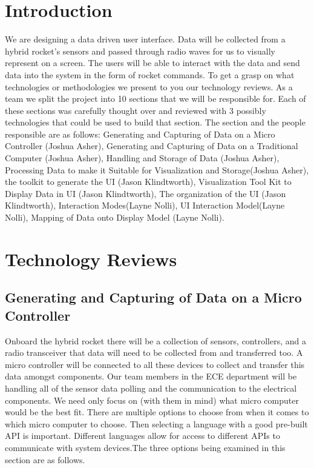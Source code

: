 \documentclass[10pt,draftclsnofoot,onecolumn]{IEEEtran}
\begin{document}
\section{Introduction}
We are designing a data driven user interface. Data will be collected from a hybrid rocket's sensors and passed through radio waves for us to visually represent on a screen. The users will be able to interact with the data and send data into the system in the form of rocket commands. To get a grasp on what technologies or methodologies we present to you our technology reviews. As a team we split the project into 10 sections that we will be responsible for. Each of these sections was carefully thought over and reviewed with 3 possibly technologies that could be used to build that section. The section and the people responsible are as follows: Generating and Capturing of Data on a Micro Controller (Joshua Asher), Generating and Capturing of Data on a Traditional Computer (Joshua Asher), Handling and Storage of Data (Joshua Asher), Processing Data to make it Suitable for Visualization and Storage(Joshua Asher), the toolkit to generate the UI (Jason Klindtworth), Visualization Tool Kit to Display Data in UI (Jason Klindtworth), The organization of the UI (Jason Klindtworth), Interaction Modes(Layne Nolli), UI Interaction Model(Layne Nolli), Mapping of Data onto Display Model (Layne Nolli). 

\section{Technology Reviews}
\subsection{Generating and Capturing of Data on a Micro Controller}
Onboard the hybrid rocket there will be a collection of sensors, controllers, and a radio transceiver that data will need to be collected from and transferred too. A micro controller will be connected to all these devices to collect and transfer this data amongst components. Our team members in the ECE department will be handling all of the sensor data polling and the communication to the electrical components. We need only focus on (with them in mind) what micro computer would be the best fit. There are multiple options to choose from when it comes to which micro computer to choose. Then selecting a language with a good pre-built API is important. Different languages allow for access to different APIs to communicate with system devices.The three options being examined in this section are as follows. \\
\end{document}
